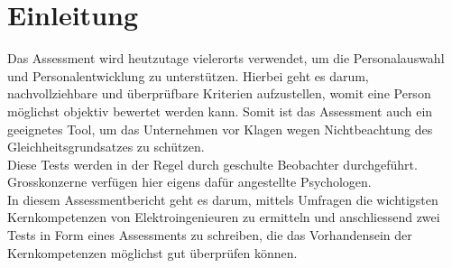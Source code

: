 
\chapter{Einleitung}

Das Assessment wird heutzutage vielerorts verwendet, um die Personalauswahl und Personalentwicklung zu unterstützen. Hierbei geht es darum, nachvollziehbare und überprüfbare Kriterien aufzustellen, womit eine Person möglichst objektiv bewertet werden kann. Somit ist das Assessment auch ein geeignetes Tool, um das Unternehmen vor Klagen wegen Nichtbeachtung des Gleichheitsgrundsatzes zu schützen. \\ 
Diese Tests werden in der Regel durch geschulte Beobachter durchgeführt. Grosskonzerne verfügen hier eigens dafür angestellte Psychologen. \\
In diesem Assessmentbericht geht es darum, mittels Umfragen die wichtigsten Kernkompetenzen von Elektroingenieuren zu ermitteln und anschliessend zwei Tests in Form eines Assessments zu schreiben, die das Vorhandensein der Kernkompetenzen möglichst gut überprüfen können.
  

